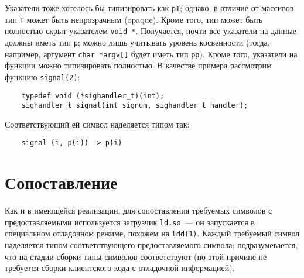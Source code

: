 \documentclass[russian,a4paper,12pt]{article}
\begin{document}
Указатели тоже хотелось бы типизировать как \verb|pT|; однако, в отличие от массивов,
тип \verb|T| может быть непрозрачным (opaque).  Кроме того, тип может быть полностью
скрыт указателем \verb|void *|.  Получается, почти все указатели на данные должны
иметь тип \verb|p|; можно лишь учитывать уровень косвенности (тогда, например,
аргумент \verb|char *argv[]| будет иметь тип \verb|pp|).  Кроме того, указатели
на функции можно типизировать полностью.  В качестве примера рассмотрим
функцию \verb|signal(2)|:
\begin{verbatim}
    typedef void (*sighandler_t)(int);
    sighandler_t signal(int signum, sighandler_t handler);
\end{verbatim}
Соответствующий ей символ наделяется типом так:
\begin{verbatim}
    signal (i, p(i)) -> p(i)
\end{verbatim}
\begin{comment}
Это что же получается если бы handler возвращал значение, то было бы две стрелки,
потипа right associative?  И точно ли никакой глупости не может быть с этими стрелками?
\end{comment}

\section{Сопоставление}
Как и в имеющейся реализации, для сопоставления требуемых символов с предоставляемыми
используется загрузчик \verb|ld.so|~--- он запускается в специальном отладочном режиме,
похожем на \verb|ldd(1)|.  Каждый требуемый символ наделяется типом
соответствующего предоставляемого символа; подразумевается, что на стадии сборки
типы символов соответствуют (по этой причине не требуется сборки клиентского кода
с отладочной информацией).
\begin{comment}
Формат DWARF, кажется, вообще не предусматривает подробного описания вызова функций
(приведение фактических параметров к формальным и т.\,п.).
То есть нету там такого дела, чтобы было написано: дескать прямо перед вызовом
функции foo() я вижу ее так-то, передаю ей такие-то аргументы, для некоторых
из них выполняется cast.
\end{comment}
\end{document}
